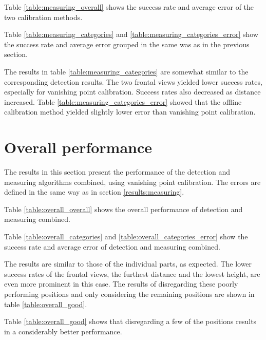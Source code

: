 Table \ref{table:measuring_overall} shows the success rate and average error of the two calibration methods.


Table \ref{table:measuring_categories} and \ref{table:measuring_categories_error} show the success rate and average error grouped in the same was as in the previous section.





The results in table \ref{table:measuring_categories} are somewhat similar to the corresponding detection results.
The two frontal views yielded lower success rates, especially for vanishing point calibration.
Success rates also decreased as distance increased.
Table \ref{table:measuring_categories_error} showed that the offline calibration method yielded slightly lower error than vanishing point calibration.

\section{Overall performance} \label{results:overall}
The results in this section present the performance of the detection and measuring algorithms combined, using vanishing point calibration.
The errors are defined in the same way as in section \ref{results:measuring}.

Table \ref{table:overall_overall} shows the overall performance of detection and measuring combined.



Table \ref{table:overall_categories} and \ref{table:overall_categories_error} show the success rate and average error of detection and measuring combined.





The results are similar to those of the individual parts, as expected.
The lower success rates of the frontal views, the furthest distance and the lowest height, are even more prominent in this case.
The results of disregarding these poorly performing positions and only considering the remaining positions are shown in table \ref{table:overall_good}.



Table \ref{table:overall_good} shows that disregarding a few of the positions results in a considerably better performance.

